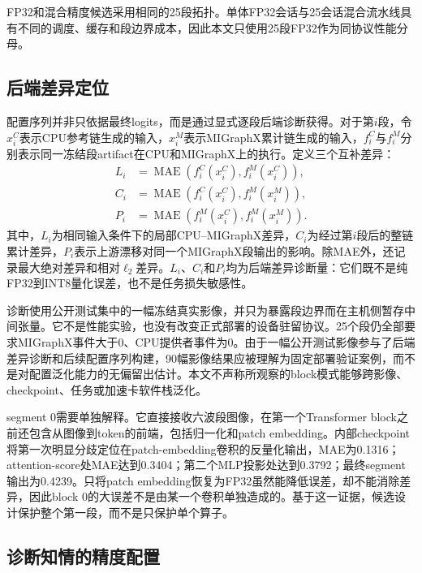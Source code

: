 \documentclass[conference]{IEEEtran}
\begin{document}
FP32和混合精度候选采用相同的25段拓扑。单体FP32会话与25会话混合流水线具有不同的调度、缓存和段边界成本，因此本文只使用25段FP32作为同协议性能分母。

\subsection{后端差异定位}

配置序列并非只依据最终logits，而是通过显式逐段后端诊断获得。对于第$i$段，令$x_i^{C}$表示CPU参考链生成的输入，$x_i^{M}$表示MIGraphX累计链生成的输入，$f_i^{C}$与$f_i^{M}$分别表示同一冻结段artifact在CPU和MIGraphX上的执行。定义三个互补差异：
\begin{equation}
\begin{aligned}
L_i &= \operatorname{MAE}\!\left(f_i^{C}(x_i^{C}),f_i^{M}(x_i^{C})\right),\\
C_i &= \operatorname{MAE}\!\left(f_i^{C}(x_i^{C}),f_i^{M}(x_i^{M})\right),\\
P_i &= \operatorname{MAE}\!\left(f_i^{M}(x_i^{C}),f_i^{M}(x_i^{M})\right).
\end{aligned}
\label{eq:localization_cn}
\end{equation}
其中，$L_i$为相同输入条件下的局部CPU--MIGraphX差异，$C_i$为经过第$i$段后的整链累计差异，$P_i$表示上游漂移对同一个MIGraphX段输出的影响。除MAE外，还记录最大绝对差异和相对$\ell_2$差异。$L_i$、$C_i$和$P_i$均为后端差异诊断量：它们既不是纯FP32到INT8量化误差，也不是任务损失敏感性。

诊断使用公开测试集中的一幅冻结真实影像，并只为暴露段边界而在主机侧暂存中间张量。它不是性能实验，也没有改变正式部署的设备驻留协议。25个段仍全部要求MIGraphX事件大于0、CPU提供者事件为0。由于一幅公开测试影像参与了后端差异诊断和后续配置序列构建，90幅影像结果应被理解为固定部署验证案例，而不是对配置泛化能力的无偏留出估计。本文不声称所观察的block模式能够跨影像、checkpoint、任务或加速卡软件栈泛化。

segment 0需要单独解释。它直接接收六波段图像，在第一个Transformer block之前还包含从图像到token的前端，包括归一化和patch embedding。内部checkpoint将第一次明显分歧定位在patch-embedding卷积的反量化输出，MAE为0.1316；attention-score处MAE达到0.3404；第二个MLP投影处达到0.3792；最终segment输出为0.4239。只将patch embedding恢复为FP32虽然能降低误差，却不能消除差异，因此block 0的大误差不是由某一个卷积单独造成的。基于这一证据，候选设计保护整个第一段，而不是只保护单个算子。

\subsection{诊断知情的精度配置}
\end{document}
